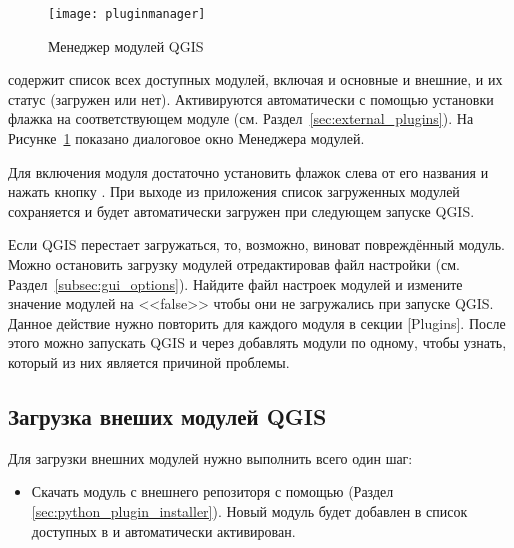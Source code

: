 \begin{figure}[ht]
   \centering
   \texttt{[image: pluginmanager]}
   \caption{Менеджер модулей QGIS \wincaption}\label{fig:pluginmanager}\smallskip
\end{figure}

 содержит список всех доступных модулей,
включая и основные и внешние, и их статус (загружен или нет).
Активируются автоматически с помощью установки флажка на соответствующем
модуле (см. Раздел~\ref{sec:external_plugins}).
На Рисунке~\ref{fig:pluginmanager} показано диалоговое окно Менеджера
модулей.

Для включения модуля достаточно установить флажок слева от его названия
и нажать кнопку . При выходе из приложения список
загруженных модулей сохраняется и будет автоматически загружен при
следующем запуске QGIS.

\begin{Tip}\caption{\textsc{Повреждённые модули}}
Если QGIS перестает загружаться, то, возможно, виноват повреждённый
модуль. Можно остановить загрузку модулей отредактировав файл настройки
(см. Раздел~\ref{subsec:gui_options}). Найдите файл настроек модулей и
измените значение модулей на <<false>> чтобы они не загружались при
запуске QGIS.
\normalfont
Данное действие нужно повторить для каждого модуля в секции [Plugins].
После этого можно запускать QGIS и через 
добавлять модули по одному, чтобы узнать, который из них является
причиной проблемы.
\end{Tip}

\subsection{Загрузка внеших модулей QGIS}\label{sec:load_external_plugin}

Для загрузки внешних модулей нужно выполнить всего один шаг:

\begin{itemize}[label=--]
\item Скачать модуль с внешнего репозиторя с помощью
 (Раздел \ref{sec:python_plugin_installer}).
Новый модуль будет добавлен в список доступных в
 и автоматически активирован.
\end{itemize}

